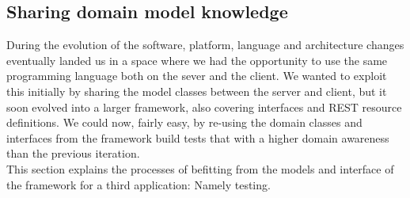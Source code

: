 \subsection{Sharing domain model knowledge}
During the evolution of the software, platform, language and architecture changes eventually landed us in a space where we had the opportunity to use the same programming language both on the sever and the client. We wanted to exploit this initially by sharing the model classes between the server and client, but it soon evolved into a larger framework, also covering interfaces and REST resource definitions. We could now, fairly easy, by re-using the domain classes and interfaces from the framework build tests that with a higher domain awareness than the previous iteration.\\
This section explains the processes of befitting from the models and interface of the framework for a third application: Namely testing. 

